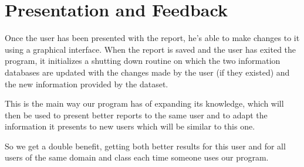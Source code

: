 \section{Presentation and Feedback}
\label{cap2:sec:feedback}

Once the user has been presented with the report, he's able to make changes to it using a graphical interface. When the report is saved and the user has exited the program, it initializes a shutting down routine on which the two information databases are updated with the changes made by the user (if they existed) and the new information provided by the dataset.

This is the main way our program has of expanding its knowledge, which will then be used to present better reports to the same user and to adapt the information it presents to new users which will be similar to this one.

So we get a double benefit, getting both better results for this user and for all users of the same domain and class each time someone uses our program.



